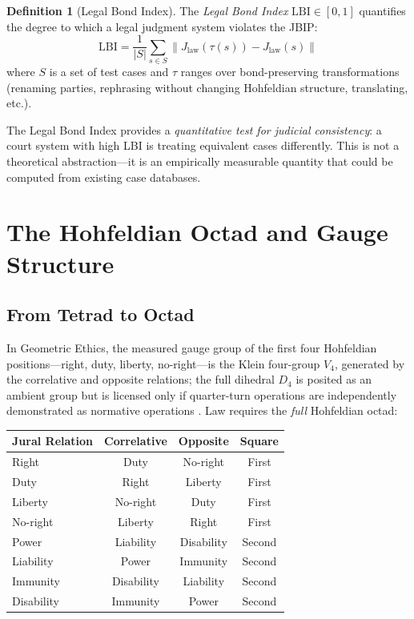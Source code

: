 \documentclass[12pt]{article}
\theoremstyle{definition}
\newtheorem{definition}[theorem]{Definition}
\theoremstyle{remark}
\newcommand{\LBI}{\mathrm{LBI}}            %
\begin{document}
\begin{definition}[Legal Bond Index]
\label{def:lbi}
The \emph{Legal Bond Index} $\LBI \in [0, 1]$ quantifies the degree to which a legal judgment system violates the JBIP:
\begin{equation}
\LBI = \frac{1}{|S|} \sum_{s \in S} \| J_{\text{law}}(\tau(s)) - J_{\text{law}}(s) \|
\label{eq:lbi}
\end{equation}
where $S$ is a set of test cases and $\tau$ ranges over bond-preserving transformations (renaming parties, rephrasing without changing Hohfeldian structure, translating, etc.).
\end{definition}

The Legal Bond Index provides a \emph{quantitative test for judicial consistency}: a court system with high LBI is treating equivalent cases differently.  This is not a theoretical abstraction---it is an empirically measurable quantity that could be computed from existing case databases.


\section{The Hohfeldian Octad and Gauge Structure}
\label{sec:gauge}

\subsection{From Tetrad to Octad}

In Geometric Ethics, the measured gauge group of the first four Hohfeldian positions---right, duty, liberty, no-right---is the Klein four-group $V_4$, generated by the correlative and opposite relations; the full dihedral $D_4$ is posited as an ambient group but is licensed only if quarter-turn operations are independently demonstrated as normative operations \cite{bond2026geometric}.  Law requires the \emph{full} Hohfeldian octad:

\begin{center}
\begin{tabular}{lccc}
\toprule
\textbf{Jural Relation} & \textbf{Correlative} & \textbf{Opposite} & \textbf{Square} \\
\midrule
Right & Duty & No-right & First \\
Duty & Right & Liberty & First \\
Liberty & No-right & Duty & First \\
No-right & Liberty & Right & First \\
\midrule
Power & Liability & Disability & Second \\
Liability & Power & Immunity & Second \\
Immunity & Disability & Liability & Second \\
Disability & Immunity & Power & Second \\
\bottomrule
\end{tabular}
\end{center}
\end{document}
